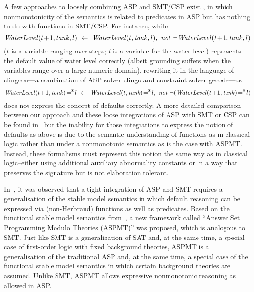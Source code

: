 \documentclass[runningheads]{llncs}
\def\ar{\leftarrow}
\def\beq{\begin{equation}}
\def\eeq#1{\label{#1}\end{equation}}
\def\ba{\begin{array}}
\def\ea{\end{array}}
\def\i#1{\hbox{\it #1\/}}
\def\no{\i{not}}
\def\ar{\leftarrow}
\begin{document}
A few approaches to loosely combining ASP and SMT/CSP exist
\cite{gebser09constraint,balduccini09representing,janhunen11tight},
in which nonmonotonicity of the semantics is related to predicates in
ASP but has nothing to do with functions in SMT/CSP. For instance, while 
\[
  \i{WaterLevel}(t\!+\!1,\i{tank}, l)\ \ar\ \i{WaterLevel}(t, \i{tank}, l),\ 
     \no\ \neg \i{WaterLevel}(t\!+\!1, \i{tank}, l)
\]
($t$ is a variable ranging over steps; $l$ is a variable for the water level) 
represents the default value of water level correctly (albeit grounding
suffers when the variables range over a large numeric domain), 
rewriting it in the language of {\sc clingcon}---a combination of ASP
solver {\sc clingo} and constraint solver {\sc gecode}---as 
\[
  \i{WaterLevel}(t\!+\!1, \i{tank})\!=^\$\! l\ \ar\
       \i{WaterLevel}(t,\i{tank})\!=^\$\! l,\ 
             \no\ \neg(\i{WaterLevel}(t\!+\!1,\i{tank})\!=^\$\! l) 
\]
does not express the concept of defaults correctly. 
\BOCC
A more detailed comparison between our approach and these loose integrations of ASP with SMT or CSP can be found in~\cite{bartholomew13functional} but
the inability for those integrations to express the notion of defaults
as above is due to the semantic understanding of functions as in 
classical logic rather than under a nonmonotonic semantics as is the
case with ASPMT. Instead, these formalisms must represent this notion
the same way as in classical logic--either using additional auxiliary 
abnormality constants or in a way that preserves the signature but is 
not elaboration tolerant.
\EOCC

In~\cite{bartholomew13functional}, it was observed that a tight
integration of ASP and SMT requires a generalization of the
stable model semantics in which default reasoning can be expressed
via (non-Herbrand) functions as well as predicates. Based on the
functional stable model semantics from~\cite{bartholomew12stable}, a
new framework called ``Answer Set Programming Modulo Theories (ASPMT)'' was proposed, which is analogous to SMT. 
Just like SMT is a generalization of SAT and, at the same time, a
special case of first-order logic with fixed background theories, 
ASPMT is a generalization of the traditional ASP and,
at the same time, a special case of the functional stable model
semantics in which certain background theories are assumed. Unlike
SMT, ASPMT allows expressive nonmonotonic reasoning as allowed in ASP.
\end{document}
